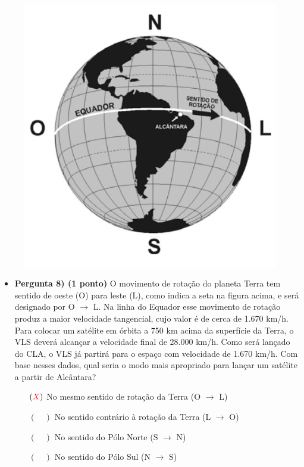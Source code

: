\documentclass[a4paper, 12pt]{article}
\newcommand{\red}[1]{\textcolor{red}{#1}}
\begin{document}
\begin{flushleft}
\begin{itemize}
\begin{figure}[H]
                    \includegraphics[scale=0.5]{img/8.png}
                \end{figure}
                \begin{itemize}
                    \item \textbf{Pergunta 8) (1 ponto)} O movimento de rotação do planeta Terra tem sentido de oeste (O) para leste (L), como indica a seta na figura acima, e será designado por O $\rightarrow$ L. Na linha do Equador esse movimento de rotação produz a maior velocidade tangencial, cujo valor é de cerca de 1.670 km/h. Para colocar um satélite em órbita a 750 km acima da superfície da Terra, o VLS deverá alcançar  a velocidade final de 28.000 km/h. Como será lançado do CLA, o VLS já partirá para o espaço com velocidade de 1.670 km/h. Com base nesses dados, qual seria o modo mais apropriado para lançar um satélite a partir de Alcântara?
                        \begin{itemize}
                            \item[$(\red{X})$] No mesmo sentido de rotação da Terra (O $\rightarrow$ L)
                            \item[$(\quad)$] No sentido contrário à rotação da Terra (L $\rightarrow$ O)
                            \item[$(\quad)$] No sentido do Pólo Norte (S $\rightarrow$ N)
                            \item[$(\quad)$] No sentido do Pólo Sul (N $\rightarrow$ S)
                        \end{itemize}
                \end{itemize}
            

\end{itemize}
\end{flushleft}
\end{document}
